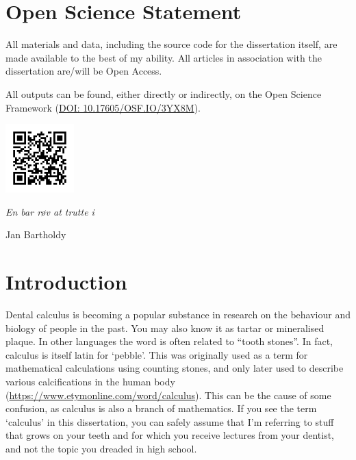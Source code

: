 \documentclass[
  b5paper,
]{book}
\begin{document}
\hypertarget{open-science-statement}{}

\chapter*{Open Science Statement}


All materials and data, including the source code for the dissertation
itself, are made available to the best of my ability. All articles in
association with the dissertation are/will be Open Access.

All outputs can be found, either directly or indirectly, on the Open
Science Framework (\href{https://doi.org/10.17605/OSF.IO/3YX8M}{DOI:
10.17605/OSF.IO/3YX8M}).

\includegraphics[width=1.04167in,height=\textheight]{figures/osf-qr.png}

\clearpage
\thispagestyle{empty}
\vspace*{3cm}

\hfill\textit{En bar røv at trutte i}

\par

\hfill\vspace*{4cm} Jan Bartholdy \vspace*{\fill}


\hypertarget{chap-intro}{%
\chapter{Introduction}\label{chap-intro}}

Dental calculus is becoming a popular substance in research on the
behaviour and biology of people in the past. You may also know it as
tartar or mineralised plaque. In other languages the word is often
related to ``tooth stones''. In fact, calculus is itself latin for
`pebble'. This was originally used as a term for mathematical
calculations using counting stones, and only later used to describe
various calcifications in the human body
(\url{https://www.etymonline.com/word/calculus}). This can be the cause
of some confusion, as calculus is also a branch of mathematics. If you
see the term `calculus' in this dissertation, you can safely assume that
I'm referring to stuff that grows on your teeth and for which you
receive lectures from your dentist, and not the topic you dreaded in
high school.
\end{document}
